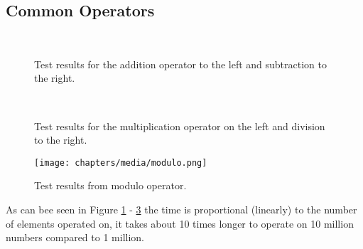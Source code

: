 \subsection{Common Operators}

\begin{figure}[h]
	\centering
	\mbox{
	}
	\caption{Test results for the addition operator to the left and subtraction to the right.}
	\label{fig:addition_subtraction}
\end{figure}

\begin{figure}[h]
	\centering
	\mbox{
	}
	\caption{Test results for the multiplication operator on the left and division to the right.}
	\label{fig:multiplication_division}
\end{figure}

\begin{figure}[h]
	\centering
	\texttt{[image: chapters/media/modulo.png]}
	\caption{Test results from modulo operator.}
	\label{fig:modulo}
\end{figure}

As can bee seen in Figure \ref{fig:addition_subtraction} - \ref{fig:modulo} the time is proportional (linearly) to the number of elements operated on, it takes about 10 times longer to operate on 10 million numbers compared to 1 million.  
